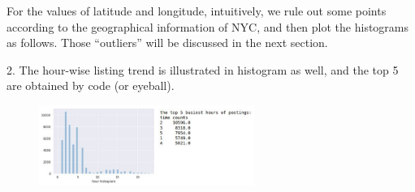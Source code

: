 \documentclass[10pt,twocolumn,letterpaper]{article}
\begin{document}
\begin{figure}[h!]%
    \centering
    \qquad
    \caption{}%
    \label{fig:example}%
\end{figure}

For the values of latitude and longitude, intuitively, we rule out some points according to the geographical information of NYC, and then plot the histograms as follows. Those “outliers” will be discussed in the next section.

\begin{figure}[h!]%
    \centering
    \qquad
    \caption{}%
    \label{fig:example}%
\end{figure}


2. The hour-wise listing trend is illustrated in histogram as well, and the top 5 are obtained by code (or eyeball).
\\
\begin{figure}[h!]
    \centering
    \includegraphics[width=7cm]{CMPT459_Pair1.png}
    \caption{}
    \label{fig:galaxy}
\end{figure}
\end{document}
